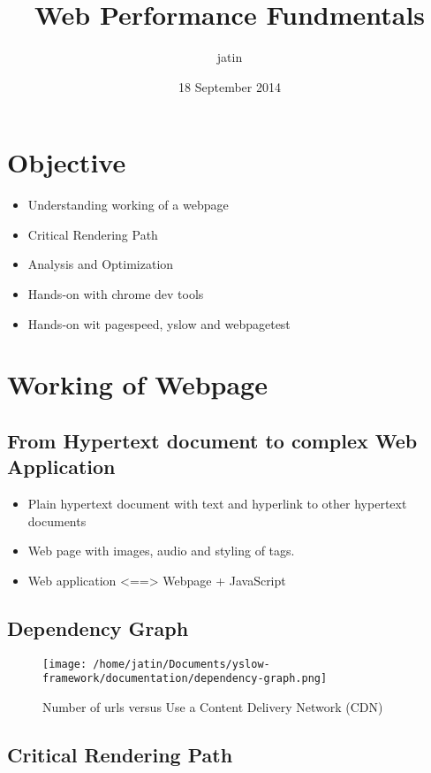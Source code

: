 \documentclass[11pt]{article}
\title{Web Performance Fundmentals}
\author{jatin}
\date{18 September 2014}
\begin{document}
\maketitle

\setcounter{tocdepth}{3}
\tableofcontents
\vspace*{1cm}
\section{Objective}
\label{sec-1}

\begin{itemize}
\item Understanding working of a webpage
\item Critical Rendering Path
\item Analysis and Optimization
\item Hands-on with chrome dev tools
\item Hands-on wit pagespeed, yslow and webpagetest
\end{itemize}
\section{Working of Webpage}
\label{sec-2}

\subsection{From Hypertext document to complex Web Application}
\label{sec-2.1}

\begin{itemize}
\item Plain hypertext document with text and hyperlink to other hypertext documents
\item Web page with images, audio and styling of tags.
\item Web application <==> Webpage + JavaScript
\end{itemize}
\subsection{Dependency Graph}
\label{sec-2.2}
\begin{figure}[ht]
 \centering
  \texttt{[image: /home/jatin/Documents/yslow-framework/documentation/dependency-graph.png]}
\caption{Number of urls versus Use a Content Delivery Network (CDN)}	
\label{fig:dg}
\end{figure}   
\subsection{Critical Rendering Path}
\label{sec-2.3}
\end{document}
